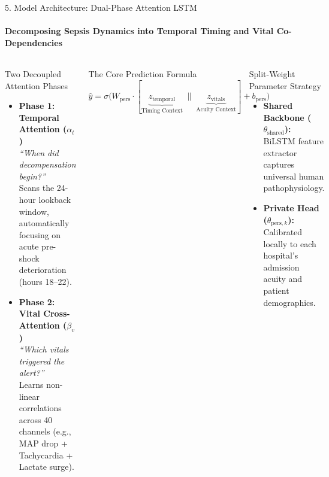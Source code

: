 \documentclass[aspectratio=169, 10pt]{beamer}
\begin{document}
\begin{frame}{5. Model Architecture: Dual-Phase Attention LSTM}
    \framesubtitle{Decomposing Sepsis Dynamics into Temporal Timing and Vital Co-Dependencies}
    \begin{columns}[T]
        \begin{block}{Two Decoupled Attention Phases}
            \scriptsize
            \begin{itemize}
                \setlength\itemsep{0.2em}
                \item \textbf{Phase 1: Temporal Attention ($\alpha_t$)} \\
                \textit{``When did decompensation begin?''} \\
                Scans the 24-hour lookback window, automatically focusing on acute pre-shock deterioration (hours 18--22).
                \item \textbf{Phase 2: Vital Cross-Attention ($\beta_v$)} \\
                \textit{``Which vitals triggered the alert?''} \\
                Learns non-linear correlations across 40 channels (e.g., MAP drop + Tachycardia + Lactate surge).
            \end{itemize}
        \end{block}

        \begin{block}{The Core Prediction Formula}
            \centering
            \vspace{0.05cm}
            {\small
            $$\hat{y} = \sigma\Big(W_{\text{pers}} \cdot [\underbrace{z_{\text{temporal}}}_{\text{Timing Context}} \;\|\; \underbrace{z_{\text{vitals}}}_{\text{Acuity Context}}] + b_{\text{pers}}\Big)$$
            }
            \vspace{0.05cm}
        \end{block}

        \begin{exampleblock}{Split-Weight Parameter Strategy}
            \scriptsize
            \begin{itemize}
                \setlength\itemsep{0.15em}
                \item \textbf{Shared Backbone ($\theta_{\text{shared}}$):} BiLSTM feature extractor captures universal human pathophysiology.
                \item \textbf{Private Head ($\theta_{\text{pers}, k}$):} Calibrated locally to each hospital's admission acuity and patient demographics.
            \end{itemize}
        \end{exampleblock}
    \end{columns}
\end{frame}
\end{document}
